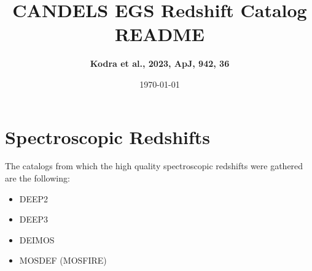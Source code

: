 \documentclass[12pt,onecolumn]{article}
\title{\textbf{CANDELS EGS Redshift Catalog README}}
\author{\textbf{Kodra et al., 2023, ApJ, 942, 36}}
\date{\today}
\begin{document}
\maketitle





\section*{Spectroscopic Redshifts}

The catalogs from which the high quality spectroscopic redshifts were gathered are the following:
\begin{itemize}
\item DEEP2
\item DEEP3
\item DEIMOS
\item MOSDEF (MOSFIRE)
\end{itemize}
\end{document}
